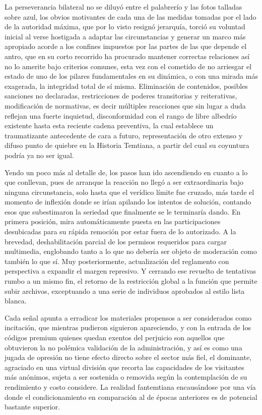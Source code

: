 \documentclass[
]{book}
\begin{document}
La perseverancia bilateral no se diluyó entre el palabrerío y las fotos talladas sobre azul, los obvios motivantes de cada una de las medidas tomadas por el lado de la autoridad máxima, que por lo visto resignó jerarquía, torció su voluntad inicial al verse hostigada a adaptar las circunstancias y generar un marco más apropiado acorde a los confines impuestos por las partes de las que depende el antro, que en su corto recorrido ha procurado mantener correctas relaciones así no lo amerite bajo criterios comunes, esta vez con el cometido de no arriesgar el estado de uno de los pilares fundamentales en su dinámica, o con una mirada más exagerada, la integridad total de sí misma. Eliminación de contenidos, posibles sanciones no declaradas, restricciones de poderes transitorias y reiterativas, modificación de normativas, es decir múltiples reacciones que sin lugar a duda reflejan una fuerte inquietud, disconformidad con el rango de libre albedrío existente hasta esta reciente cadena preventiva, la cual establece un traumatizante antecedente de cara a futuro, representación de otro extenso y difuso punto de quiebre en la Historia Temtiana, a partir del cual su coyuntura podría ya no ser igual.

Yendo un poco más al detalle de, los pasos han ido ascendiendo en cuanto a lo que conllevan, pues de arranque la reacción no llegó a ser extraordinaria bajo ninguna circunstancia, solo hasta que el verídico límite fue cruzado, más tarde el momento de inflexión donde se irían apilando los intentos de solución, contando esos que subestimaron la seriedad que finalmente se le terminaría dando. En primera posición, mira automáticamente puesta en las participaciones desubicadas para su rápida remoción por estar fuera de lo autorizado. A la brevedad, deshabilitación parcial de los permisos requeridos para cargar multimedia, englobando tanto a lo que no debería ser objeto de moderación como también lo que sí. Muy posteriormente, actualización del reglamento con perspectiva a expandir el margen represivo. Y cerrando ese revuelto de tentativas rumbo a un mismo fin, el retorno de la restricción global a la función que permite subir archivos, exceptuando a una serie de individuos aprobados al estilo lista blanca.

Cada señal apunta a erradicar los materiales propensos a ser considerados como incitación, que mientras pudieron siguieron apareciendo, y con la entrada de los códigos premium quienes quedan exentos del perjuicio son aquellos que obtuvieron la no polémica validación de la administración, y así es como una jugada de opresión no tiene efecto directo sobre el sector más fiel, el dominante, agraciado en una virtual división que recorta las capacidades de los visitantes más anónimos, sujeta a ser sostenida o removida según la contemplación de su rendimiento y costo considere. La realidad fantemtiana encausándose por una vía donde el condicionamiento en comparación al de épocas anteriores es de potencial bastante superior.
\end{document}
